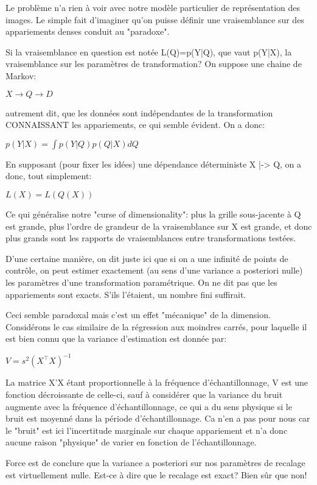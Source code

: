 \documentclass{article}
\begin{document}
Le probl\`eme n'a rien \`a voir avec notre mod\`ele particulier de repr\'esentation des images. Le simple fait d'imaginer qu'on puisse d\'efinir une vraisemblance sur des appariements denses conduit au "paradoxe". 

Si la vraisemblance en question est not\'ee L(Q)=p(Y|Q), que vaut p(Y|X), la vraisemblance sur les param\`etres de transformation? On suppose une chaine de Markov: 

$X \to Q \to D$ 

autrement dit, que les donn\'ees sont ind\'ependantes de la transformation CONNAISSANT les appariements, ce qui semble \'evident. On a donc: 

$p(Y|X) = \int p(Y|Q)p(Q|X) dQ$ 

En supposant (pour fixer les id\'ees) une d\'ependance d\'eterministe X |-> Q, on a donc, tout simplement: 

$L(X) = L(Q(X))$ 

Ce qui g\'en\'eralise notre "curse of dimensionality": plus la grille sous-jacente \`a Q est grande, plus l'ordre de grandeur de la vraisemblance sur X est grande, et donc plus grands sont les rapports de vraisemblances entre transformations test\'ees.  

D'une certaine mani\`ere, on dit juste ici que si on a une infinit\'e de points de contr\^ole, on peut estimer exactement (au sens d'une variance a posteriori nulle) les param\`etres d'une transformation param\'etrique. On ne dit pas que les appariements sont exacts. S'ils l'\'etaient, un nombre fini suffirait. 

Ceci semble paradoxal mais c'est un effet "m\'ecanique" de la dimension. Consid\'erons le cas similaire de la r\'egression aux moindres carr\'es, pour laquelle il est bien connu que la variance d'estimation est donn\'ee par: 

$V = s^2 (X^\top X)^{-1}$ 

La matrice X'X \'etant proportionnelle \`a la fr\'equence d'\'echantillonnage, V est une fonction d\'ecroissante de celle-ci, sauf \`a consid\'erer que la variance du bruit augmente avec la fr\'equence d'\'echantillonnage, ce qui a du sens physique si le bruit est moyenn\'e dans la p\'eriode d'\'echantillonnage. Ca n'en a pas pour nous car le "bruit" est ici l'incertitude marginale sur chaque appariement et n'a donc aucune raison "physique" de varier en fonction de l'\'echantillonnage. 

Force est de conclure que la variance a posteriori sur nos param\`etres de recalage est virtuellement nulle. Est-ce \`a dire que le recalage est exact? Bien s\^ur que non! 
\end{document}
